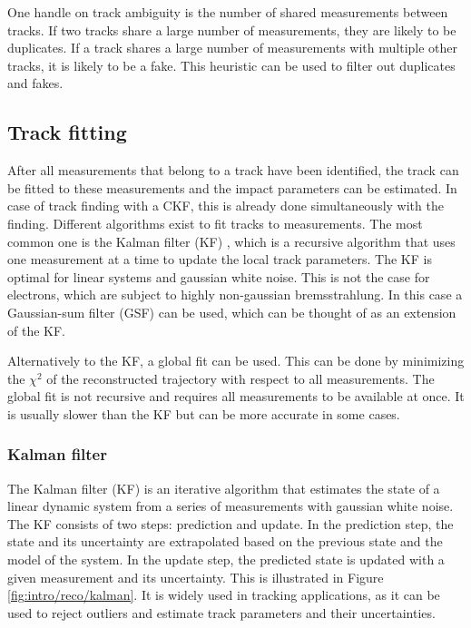 One handle on track ambiguity is the number of shared measurements between tracks. If two tracks share a large number of measurements, they are likely to be duplicates. If a track shares a large number of measurements with multiple other tracks, it is likely to be a fake. This heuristic can be used to filter out duplicates and fakes.

\subsection{Track fitting}

After all measurements that belong to a track have been identified, the track can be fitted to these measurements and the impact parameters can be estimated. In case of track finding with a CKF, this is already done simultaneously with the finding. Different algorithms exist to fit tracks to measurements. The most common one is the Kalman filter (KF) \cite{fruehwirth}, which is a recursive algorithm that uses one measurement at a time to update the local track parameters. The KF is optimal for linear systems and gaussian white noise. This is not the case for electrons, which are subject to highly non-gaussian bremsstrahlung. In this case a Gaussian-sum filter (GSF) \cite{fruehwirth-gsf} can be used, which can be thought of as an extension of the KF.

Alternatively to the KF, a global fit can be used. This can be done by minimizing the $\chi^2$ of the reconstructed trajectory with respect to all measurements. The global fit is not recursive and requires all measurements to be available at once. It is usually slower than the KF but can be more accurate in some cases.

\subsubsection{Kalman filter}

The Kalman filter (KF) is an iterative algorithm that estimates the state of a linear dynamic system from a series of measurements with gaussian white noise. The KF consists of two steps: prediction and update. In the prediction step, the state and its uncertainty are extrapolated based on the previous state and the model of the system. In the update step, the predicted state is updated with a given measurement and its uncertainty. This is illustrated in Figure \ref{fig:intro/reco/kalman}. It is widely used in tracking applications, as it can be used to reject outliers and estimate track parameters and their uncertainties.

